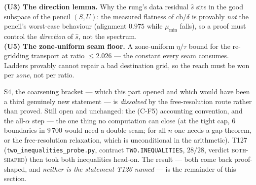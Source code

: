 \documentclass[11pt,a4paper]{article}
\begin{document}
\begin{keybox}
\textbf{(U3) The direction lemma.} Why the rung's data residual $\hat s$ sits in the good subspace
of the pencil $(S,U)$: the measured flatness of $\mathrm{cb}/\delta$ is provably \emph{not} the
pencil's worst-case behaviour (alignment $0.975$ while $\mu_{\min}$ falls), so a proof must control
the \emph{direction} of $\hat s$, not the spectrum.\\[3pt]
\textbf{(U5) The zone-uniform seam floor.} A zone-uniform $\eta/\tau$ bound for the re-gridding
transport at ratio $\le2.026$ --- the constant every seam consumes. Ladders provably cannot repair a
bad destination grid, so the reach must be won per \emph{zone}, not per ratio.
\end{keybox}

\noindent S4, the coarsening bracket --- which this part opened and which would have been a third
genuinely new statement --- is \emph{dissolved} by the free-resolution route rather than proved.
Still open and unchanged: the (C-F5) accounting convention, and the all-$\alpha$ step --- the one
thing no computation can close (at the tight cap, $6$ boundaries in $9\,700$ would need a double
seam; for all $n$ one needs a gap theorem, or the free-resolution relaxation, which is unconditional
in the arithmetic). T127 (\texttt{two\_inequalities\_probe.py}, contract
\texttt{TWO.INEQUALITIES}, $28/28$, verdict \textsc{both-shaped}) then took both inequalities
head-on. The result --- both come back proof-shaped, and \emph{neither is the statement T126
named} --- is the remainder of this section.
\end{document}
